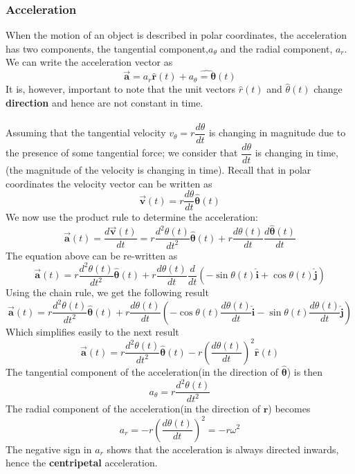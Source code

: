 \documentclass[12pt,addpoints]{exam}
\begin{document}
	\subsubsection*{Acceleration}
	When the motion of an object is described in polar coordinates, the acceleration has two components, the tangential component,$a_\theta$ and the radial component, $a_r$. We can write the acceleration vector as
	$$\overrightarrow{\mathbf{a}}=a_{r} \hat{\mathbf{r}}(t)+a_{\theta} \hat{=\boldsymbol{\theta}}(t)$$
	It is, however, important to note that the unit vectors  $\hat r(t)$ and $\hat \theta(t)$ change \textbf{direction} and hence are not constant in time. \\ \\
	Assuming that the tangential velocity $v_\theta=r\dfrac{d\theta}{dt}$	is changing in magnitude due to the presence of some tangential force; we consider that $\dfrac{d\theta}{dt}$ is changing in time, (the magnitude of the velocity is changing in time). Recall that in polar coordinates the velocity vector can be written as
	$$\overrightarrow{\mathbf{v}}(t)=r \frac{d \theta}{d t} \hat{\boldsymbol{\theta}}(t)$$
	We now use the product rule to determine the acceleration:
	$$\overrightarrow{\mathbf{a}}(t)=\frac{d \overrightarrow{\mathbf{v}}(t)}{d t}=r \frac{d^{2} \theta(t)}{d t^{2}} \hat{\boldsymbol{\theta}}(t)+r \frac{d \theta(t)}{d t} \frac{d \hat{\boldsymbol{\theta}}(t)}{d t}$$
	The equation above can be re-written as
	$$\overrightarrow{\mathbf{a}}(t)=r \frac{d^{2} \theta(t)}{d t^{2}} \hat{\boldsymbol{\theta}}(t)+r \frac{d \theta(t)}{d t} \frac{d}{d t}(-\sin \theta(t) \hat{\mathbf{i}}+\cos \theta(t) \hat{\mathbf{j}})$$
	Using the chain rule, we get the following result
	$$\overrightarrow{\mathbf{a}}(t)=r \frac{d^{2} \theta(t)}{d t^{2}} \hat{\boldsymbol{\theta}}(t)+r \frac{d \theta(t)}{d t}\left(-\cos \theta(t) \frac{d \theta(t)}{d t} \hat{\mathbf{i}}-\sin \theta(t) \frac{d \theta(t)}{d t} \hat{\mathbf{j}}\right)$$
	Which simplifies easily to the next result
	$$\overrightarrow{\mathbf{a}}(t)=r \frac{d^{2} \theta(t)}{d t^{2}} \hat{\boldsymbol{\theta}}(t)-r\left(\frac{d \theta(t)}{d t}\right)^{2} \hat{\mathbf{r}}(t)$$
	The tangential component of the acceleration(in the direction of $\mathbf{\hat\theta}$) is then
	$$a_{\theta}=r \frac{d^{2} \theta(t)}{d t^{2}}$$
	The radial component of the acceleration(in the direction of $\mathbf{\hat{r}}$) becomes
	$$a_{r}=-r\left(\frac{d \theta(t)}{d t}\right)^{2}=-r \omega^{2}$$
	The negative sign in $a_r$ shows that the acceleration is always directed inwards, hence the \textbf{centripetal} acceleration.
\end{document}
